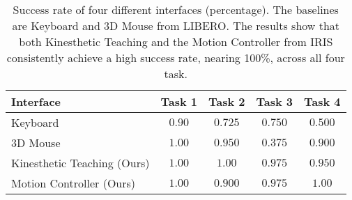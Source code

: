 \begin{table}[t]
    \centering
    \begin{tabular}{lcccc}
        \hline
        \toprule
        Interface & \textbf{Task 1} & \textbf{Task 2} & \textbf{Task 3} & \textbf{Task 4} \\
        \midrule
        Keyboard & $0.90$ & $0.725$ & $0.750$ & $0.500$ \\
        3D Mouse & $1.00$  & $0.950$ & $0.375$ & $0.900$ \\
        Kinesthetic Teaching (Ours)       & $1.00$  & $1.00$  & $0.975$ & $0.950$ \\
        Motion Controller (Ours)      & $1.00$  & $0.900$ & $0.975$ & $1.00$  \\
        \bottomrule
    \end{tabular}
    \caption{
    Success rate of four different interfaces (percentage). The baselines are Keyboard and 3D Mouse from LIBERO.
    The results show that both Kinesthetic Teaching and the Motion Controller from IRIS consistently achieve a high success rate, nearing 100\%, across all four task.
    }
    \label{tab:success_rate}
\end{table}

